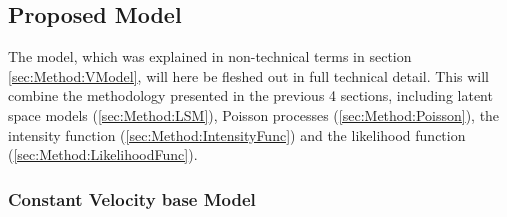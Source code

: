 
\subsection{Proposed Model}
\label{sec:Method:PiecewiseConstantVModel}

The model, which was explained in non-technical terms in section \ref{sec:Method:VModel}, will here be fleshed out in full technical detail.
This will combine the methodology presented in the previous 4 sections, including latent space models (\ref{sec:Method:LSM}), Poisson processes (\ref{sec:Method:Poisson}), the intensity function (\ref{sec:Method:IntensityFunc}) and the likelihood function (\ref{sec:Method:LikelihoodFunc}).


\subsubsection{Constant Velocity base Model}
\label{sec:Method:PiecewiseConstantVModel:ConstantVelocityModel}

